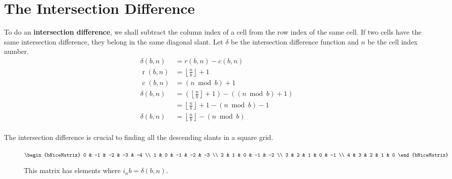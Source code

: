 \documentclass[twoside,openany,12pt]{book}
\begin{document}
    \section{The Intersection Difference} \label{intersection_diff}
    To do an \textbf{intersection difference}, we shall subtract the column index of a cell from the row index of the same cell. If two cells have the same intersection difference, they belong in the same diagonal slant. Let $\delta$ be the intersection difference function and $n$ be the cell index number.
    \begin{equation}
        \begin{split}
            \delta(b,n) &= r(b,n) - c(b,n)\\
            \operatorname{r}(b,n) &= \left\lfloor \frac{n}{b} \right\rfloor + 1 \\
            \operatorname{c}(b,n) &= (n\bmod b) + 1 \\
            \delta(b,n) &= (\left\lfloor \frac{n}{b} \right\rfloor + 1) - ((n\bmod b) + 1)\\
                        &= \left\lfloor \frac{n}{b} \right\rfloor + 1 - (n\bmod b) - 1\\
            \delta(b,n) &= \left\lfloor \frac{n}{b} \right\rfloor - (n\bmod b)\\
        \end{split}
    \end{equation}

    The intersection difference is crucial to finding all the descending slants in a square grid.

    \begin{figure}[h]
        \centering
        \begin{minipage}{0.45\textwidth}
            \centering
            {$
            \begin{bNiceMatrix}
                0 & -1 & -2 & -3 & -4 \\
                1 & 0 & -1 & -2 & -3 \\
                2 & 1 & 0 & -1 & -2 \\
                3 & 2 & 1 & 0 & -1 \\
                4 & 3 & 2 & 1 & 0
            \end{bNiceMatrix}
            $}
        \end{minipage}
        \caption{This matrix has elements where $i_{n}b = \delta(b,n)$.}
    \end{figure}
\end{document}
